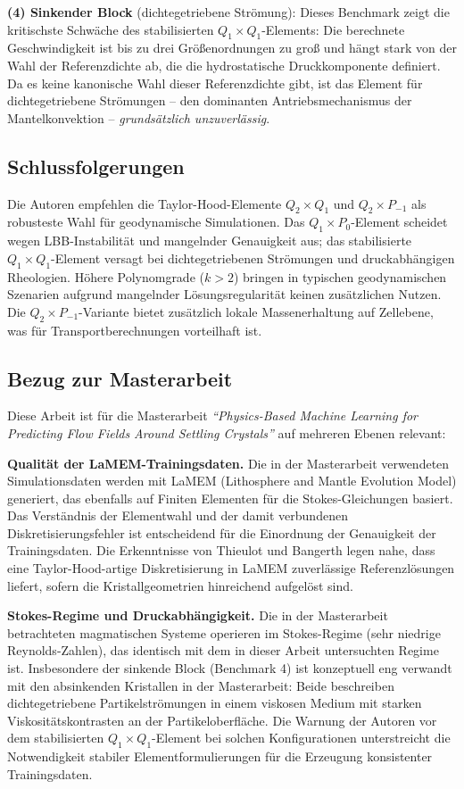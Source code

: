 \documentclass[a4paper,12pt]{article}
\begin{document}
\textbf{(4) Sinkender Block} (dichtegetriebene Strömung): Dieses Benchmark zeigt die kritischste Schwäche des stabilisierten $Q_1 \times Q_1$-Elements: Die berechnete Geschwindigkeit ist bis zu drei Größenordnungen zu groß und hängt stark von der Wahl der Referenzdichte ab, die die hydrostatische Druckkomponente definiert. Da es keine kanonische Wahl dieser Referenzdichte gibt, ist das Element für dichtegetriebene Strömungen -- den dominanten Antriebsmechanismus der Mantelkonvektion -- \emph{grundsätzlich unzuverlässig}.

\subsection*{Schlussfolgerungen}

Die Autoren empfehlen die Taylor-Hood-Elemente $Q_2 \times Q_1$ und $Q_2 \times P_{-1}$ als robusteste Wahl für geodynamische Simulationen. Das $Q_1 \times P_0$-Element scheidet wegen LBB-Instabilität und mangelnder Genauigkeit aus; das stabilisierte $Q_1 \times Q_1$-Element versagt bei dichtegetriebenen Strömungen und druckabhängigen Rheologien. Höhere Polynomgrade ($k > 2$) bringen in typischen geodynamischen Szenarien aufgrund mangelnder Lösungsregularität keinen zusätzlichen Nutzen. Die $Q_2 \times P_{-1}$-Variante bietet zusätzlich lokale Massenerhaltung auf Zellebene, was für Transportberechnungen vorteilhaft ist.

\subsection*{Bezug zur Masterarbeit}

Diese Arbeit ist für die Masterarbeit \emph{``Physics-Based Machine Learning for Predicting Flow Fields Around Settling Crystals''} auf mehreren Ebenen relevant:

\textbf{Qualität der LaMEM-Trainingsdaten.} Die in der Masterarbeit verwendeten Simulationsdaten werden mit LaMEM (Lithosphere and Mantle Evolution Model) generiert, das ebenfalls auf Finiten Elementen für die Stokes-Gleichungen basiert. Das Verständnis der Elementwahl und der damit verbundenen Diskretisierungsfehler ist entscheidend für die Einordnung der Genauigkeit der Trainingsdaten. Die Erkenntnisse von Thieulot und Bangerth legen nahe, dass eine Taylor-Hood-artige Diskretisierung in LaMEM zuverlässige Referenzlösungen liefert, sofern die Kristallgeometrien hinreichend aufgelöst sind.

\textbf{Stokes-Regime und Druckabhängigkeit.} Die in der Masterarbeit betrachteten magmatischen Systeme operieren im Stokes-Regime (sehr niedrige Reynolds-Zahlen), das identisch mit dem in dieser Arbeit untersuchten Regime ist. Insbesondere der sinkende Block (Benchmark 4) ist konzeptuell eng verwandt mit den absinkenden Kristallen in der Masterarbeit: Beide beschreiben dichtegetriebene Partikelströmungen in einem viskosen Medium mit starken Viskositätskontrasten an der Partikeloberfläche. Die Warnung der Autoren vor dem stabilisierten $Q_1 \times Q_1$-Element bei solchen Konfigurationen unterstreicht die Notwendigkeit stabiler Elementformulierungen für die Erzeugung konsistenter Trainingsdaten.
\end{document}
